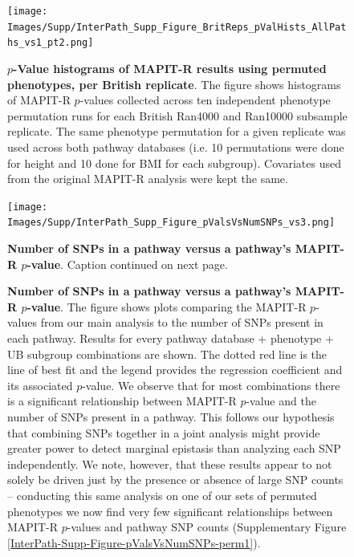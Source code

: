 \documentclass[12pt,a4paper]{article}
\begin{document}
\setlength{\footskip}{2cm}
\begin{figure}[htbp]
\centering
\vspace*{-1cm}
\texttt{[image: Images/Supp/InterPath\_Supp\_Figure\_BritReps\_pValHists\_AllPaths\_vs1\_pt2.png]}
\caption[TBD]{\textbf{$p$-Value histograms of MAPIT-R results using permuted phenotypes, per British replicate}. The figure shows histograms of MAPIT-R $p$-values collected across ten independent phenotype permutation runs for each British Ran4000 and Ran10000 subsample replicate. The same phenotype permutation for a given replicate was used across both pathway databases (i.e. 10 permutations were done for height and 10 done for BMI for each subgroup). Covariates used from the original MAPIT-R analysis were kept the same.}
\label{InterPath-Supp-Figure-BritReps-10perms-pValHists-pt2}
\end{figure}
\clearpage
\setlength{\footskip}{1cm}

\setlength{\footskip}{3cm}
\begin{figure}[htbp]
\centering
\vspace*{-2cm}
\texttt{[image: Images/Supp/InterPath\_Supp\_Figure\_pValsVsNumSNPs\_vs3.png]}
\caption[TBD]{\textbf{Number of SNPs in a pathway versus a pathway's MAPIT-R $p$-value}. Caption continued on next page.}
\label{InterPath-Supp-Figure-pValsVsNumSNPs}
\end{figure}
\clearpage
\setlength{\footskip}{1cm}

\addtocounter{figure}{-1}
\begin{figure} [t!]
  \caption{\textbf{Number of SNPs in a pathway versus a pathway's MAPIT-R $p$-value}. The figure shows plots comparing the MAPIT-R $p$-values from our main analysis to the number of SNPs present in each pathway. Results for every pathway database + phenotype + UB subgroup combinations are shown. The dotted red line is the line of best fit and the legend provides the regression coefficient and its associated $p$-value. We observe that for most combinations there is a significant relationship between MAPIT-R $p$-value and the number of SNPs present in a pathway. This follows our hypothesis that combining SNPs together in a joint analysis might provide greater power to detect marginal epistasis than analyzing each SNP independently. We note, however, that these results appear to not solely be driven just by the presence or absence of large SNP counts -- conducting this same analysis on one of our sets of permuted phenotypes we now find very few significant relationships between MAPIT-R $p$-values and pathway SNP counts (Supplementary Figure \ref{InterPath-Supp-Figure-pValsVsNumSNPs-perm1}).}
\label{InterPath-Supp-Figure-pValsVsNumSNPs-Caption}
\end{figure}
\clearpage
\end{document}
